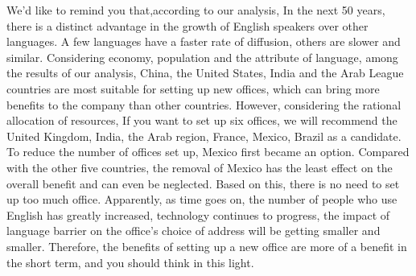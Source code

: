 \documentclass{mcmthesis}
\begin{document}
  We'd like to remind you that,according to our analysis,
  In the next 50 years, there is a distinct advantage in the growth of English speakers over other languages.
  A few languages have a faster rate of diffusion,
  others are slower and similar.
  Considering economy,
  population and the attribute of language, among the results of our analysis, China, the United States, India and the Arab League countries
  are most suitable for setting up new offices,
  which can bring more benefits to the company than other countries.
  However, considering the rational allocation of resources,
  If you want to set up six offices,
  we will recommend the United Kingdom, India, the Arab region, France, Mexico, Brazil as a candidate.
  To reduce the number of offices set up,
  Mexico first became an option.
  Compared with the other five countries,
  the removal of Mexico has the least effect on the overall benefit and can even be neglected.
  Based on this, there is no need to set up too much office.
  Apparently, as time goes on, the number of people who use English has greatly increased, technology continues to progress,
  the impact of language barrier on the office's choice of address will be getting smaller and smaller.
  Therefore, the benefits of setting up a new office are more of a benefit in the short term,
  and you should think in this light.
\end{document}
